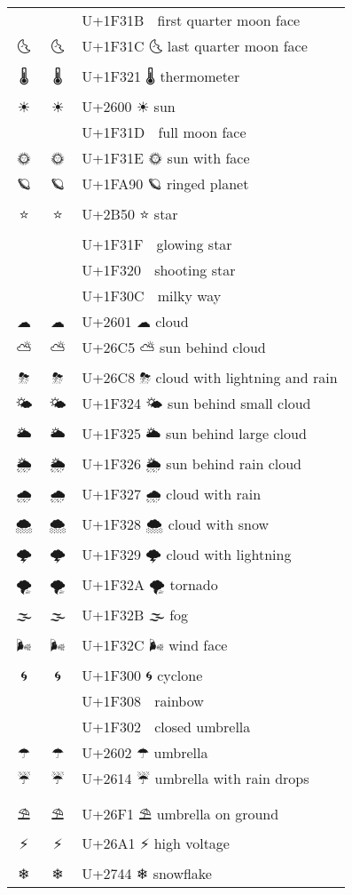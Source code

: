 \documentclass[a4paper,12pt]{article}
\newcommand{\fontA}[1]{{\fontspec[RawFeature={mode=harf,+dist,+ccmp}]{Segoe UI Emoji} #1}}
\newcommand{\fontB}[1]{{\fontspec[RawFeature={mode=harf,+dist,+ccmp}]{Noto Color Emoji} #1}}
\begin{document}
\begin{longtable}[c]{ccp{0.8\linewidth}}
\fontA{🌛}&\fontB{🌛}&U+1F31B 🌛 first quarter moon face\\
\fontA{🌜}&\fontB{🌜}&U+1F31C 🌜 last quarter moon face\\
\fontA{🌡}&\fontB{🌡}&U+1F321 🌡 thermometer\\
\fontA{☀}&\fontB{☀}&U+2600 ☀ sun\\
\fontA{🌝}&\fontB{🌝}&U+1F31D 🌝 full moon face\\
\fontA{🌞}&\fontB{🌞}&U+1F31E 🌞 sun with face\\
\fontA{🪐}&\fontB{🪐}&U+1FA90 🪐 ringed planet\\
\fontA{⭐}&\fontB{⭐}&U+2B50 ⭐ star\\
\fontA{🌟}&\fontB{🌟}&U+1F31F 🌟 glowing star\\
\fontA{🌠}&\fontB{🌠}&U+1F320 🌠 shooting star\\
\fontA{🌌}&\fontB{🌌}&U+1F30C 🌌 milky way\\
\fontA{☁}&\fontB{☁}&U+2601 ☁ cloud\\
\fontA{⛅}&\fontB{⛅}&U+26C5 ⛅ sun behind cloud\\
\fontA{⛈}&\fontB{⛈}&U+26C8 ⛈ cloud with lightning and rain\\
\fontA{🌤}&\fontB{🌤}&U+1F324 🌤 sun behind small cloud\\
\fontA{🌥}&\fontB{🌥}&U+1F325 🌥 sun behind large cloud\\
\fontA{🌦}&\fontB{🌦}&U+1F326 🌦 sun behind rain cloud\\
\fontA{🌧}&\fontB{🌧}&U+1F327 🌧 cloud with rain\\
\fontA{🌨}&\fontB{🌨}&U+1F328 🌨 cloud with snow\\
\fontA{🌩}&\fontB{🌩}&U+1F329 🌩 cloud with lightning\\
\fontA{🌪}&\fontB{🌪}&U+1F32A 🌪 tornado\\
\fontA{🌫}&\fontB{🌫}&U+1F32B 🌫 fog\\
\fontA{🌬}&\fontB{🌬}&U+1F32C 🌬 wind face\\
\fontA{🌀}&\fontB{🌀}&U+1F300 🌀 cyclone\\
\fontA{🌈}&\fontB{🌈}&U+1F308 🌈 rainbow\\
\fontA{🌂}&\fontB{🌂}&U+1F302 🌂 closed umbrella\\
\fontA{☂}&\fontB{☂}&U+2602 ☂ umbrella\\
\fontA{☔}&\fontB{☔}&U+2614 ☔ umbrella with rain drops\\
\fontA{⛱}&\fontB{⛱}&U+26F1 ⛱ umbrella on ground\\
\fontA{⚡}&\fontB{⚡}&U+26A1 ⚡ high voltage\\
\fontA{❄}&\fontB{❄}&U+2744 ❄ snowflake\\

\end{longtable}
\end{document}
